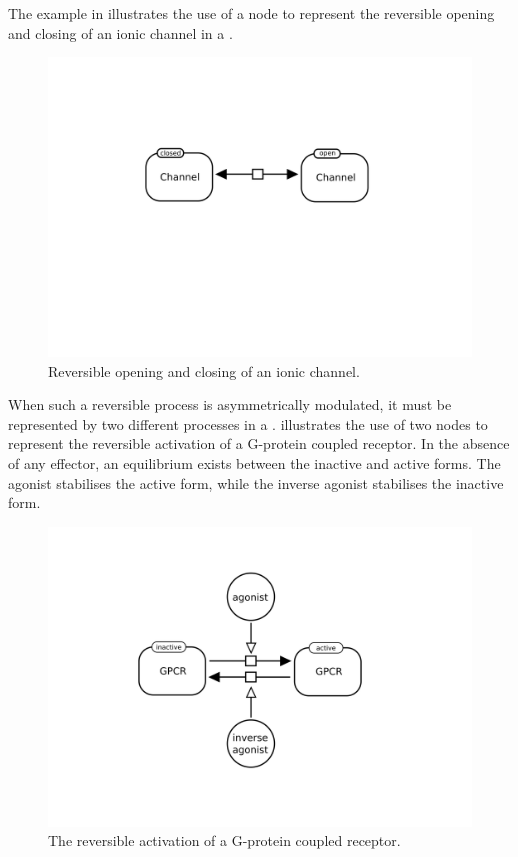 The example in  illustrates the use of a  node to represent the reversible opening and closing of an ionic channel in a \PD.

\begin{figure}[H]
  \centering
  \includegraphics[scale = 0.3]{examples/process-reversible}
  \caption{Reversible opening and closing of an ionic channel.}
  \label{fig:trans-reverse}
\end{figure}

When such a reversible process is asymmetrically modulated, it must be represented by two different processes in a \PD.   illustrates the use of two  nodes to represent the reversible activation of a G-protein coupled receptor.  In the absence of any effector, an equilibrium exists between the inactive and active forms.  The agonist stabilises the active form, while the inverse agonist stabilises the inactive form.

\begin{figure}[H]
  \centering
  \includegraphics[scale = 0.3]{examples/process-modulated}
  \caption{The reversible activation of a G-protein coupled receptor.}
  \label{fig:trans-mod}
\end{figure}


